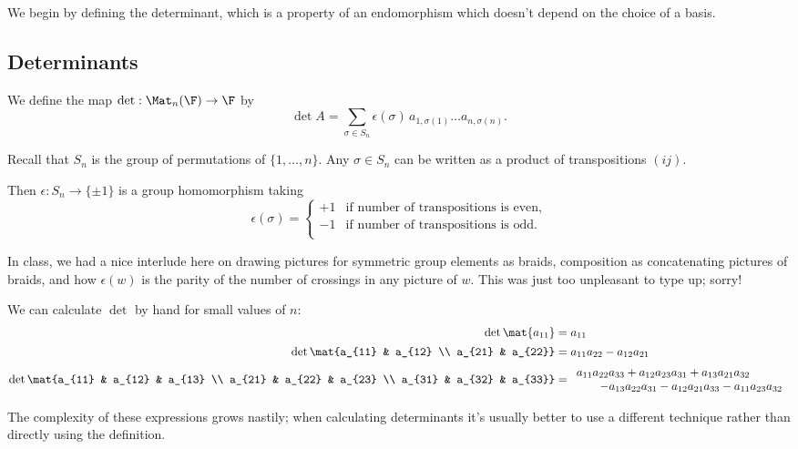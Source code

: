 We begin by defining the determinant, which is a property of an endomorphism which doesn't depend on the choice of a basis.

	\pagebreak

\subsection{Determinants} %
\label{sub:determinants}

\begin{definition}
	We define the map $\det:\Mat_n(\F) \to \F$ by %
	\begin{equation*}
		\det A=\sum_{\sigma\in S_n} \epsilon(\sigma)\,a_{1,\sigma(1)}\ldots a_{n,\sigma(n)}.
	\end{equation*}

\end{definition}

Recall that $S_n$ is the group of permutations of $\{1,\ldots,n\}$.
Any $\sigma \in S_n$ can be written as a product of transpositions $(i j)$.

Then $\epsilon:S_n\to\{\pm1\}$ is a group homomorphism taking
\begin{equation*}
	\epsilon(\sigma) =
	\begin{cases}
		+1 & \text{if number of transpositions is even,} \\ %
		-1 & \text{if number of transpositions is odd.} \\ %
	\end{cases}
\end{equation*}

In class, we had a nice interlude here on drawing pictures for symmetric group elements as braids, composition as concatenating pictures of braids, and how $\epsilon(w)$ is the parity of the number of crossings in any picture of $w$. This was just too unpleasant to type up; sorry!


\begin{example}
	We can calculate $\det$ by hand for small values of $n$: %
	\begin{align*}
		\det \mat{a_{11}}
			&= a_{11} \\[1.5pt]
		\det \mat{a_{11} & a_{12} \\ a_{21} & a_{22}}
			&= a_{11} a_{22} - a_{12} a_{21} \\[1.5pt] %
		\det \mat{a_{11} & a_{12} & a_{13} \\ a_{21} & a_{22} & a_{23} \\ a_{31} & a_{32} & a_{33}}
			&=
			\begin{array}{l}
				a_{11} a_{22} a_{33}
				+ a_{12} a_{23} a_{31}
				+ a_{13} a_{21} a_{32} \\ \qquad
				- a_{13} a_{22} a_{31}
				- a_{12} a_{21} a_{33}
				- a_{11} a_{23} a_{32} %
			\end{array}
	\end{align*}
\end{example}
	The complexity of these expressions grows nastily; when calculating determinants it's usually better to use a different technique rather than directly using the definition. %


